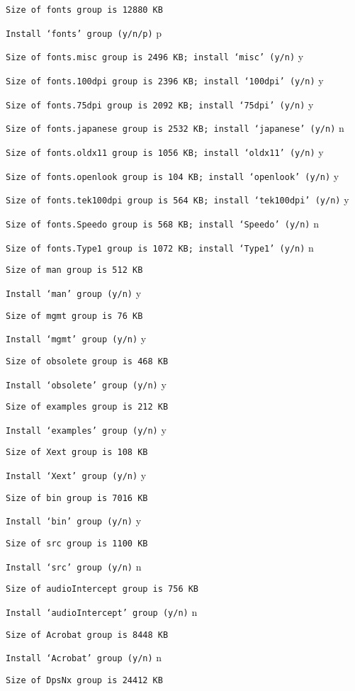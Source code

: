 \documentclass[11pt]{article}
\begin{document}
{\tt Size of fonts group is 12880 KB}

{\tt Install `fonts' group (y/n/p)} p

{\tt Size of fonts.misc group is 2496 KB; install `misc' (y/n)} y

{\tt Size of fonts.100dpi group is 2396 KB; install `100dpi' (y/n)} y

{\tt Size of fonts.75dpi group is 2092 KB; install `75dpi' (y/n)} y

{\tt Size of fonts.japanese group is 2532 KB; install `japanese' (y/n)} n

{\tt Size of fonts.oldx11 group is 1056 KB; install `oldx11' (y/n)} y

{\tt Size of fonts.openlook group is 104 KB; install `openlook' (y/n)} y

{\tt Size of fonts.tek100dpi group is 564 KB; install `tek100dpi' (y/n)} y

{\tt Size of fonts.Speedo group is 568 KB; install `Speedo' (y/n)} n

{\tt Size of fonts.Type1 group is 1072 KB; install `Type1' (y/n)} n

{\tt Size of man group is 512 KB}

{\tt Install `man' group (y/n)} y

{\tt Size of mgmt group is 76 KB}

{\tt Install `mgmt' group (y/n)} y

{\tt Size of obsolete group is 468 KB}

{\tt Install `obsolete' group (y/n)} y

{\tt Size of examples group is 212 KB}

{\tt Install `examples' group (y/n)} y

{\tt Size of Xext group is 108 KB}

{\tt Install `Xext' group (y/n)} y

{\tt Size of bin group is 7016 KB}

{\tt Install `bin' group (y/n)} y

{\tt Size of src group is 1100 KB}

{\tt Install `src' group (y/n)} n

{\tt Size of audioIntercept group is 756 KB}

{\tt Install `audioIntercept' group (y/n)} n

{\tt Size of Acrobat group is 8448 KB}

{\tt Install `Acrobat' group (y/n)} n

{\tt Size of DpsNx group is 24412 KB}
\end{document}
